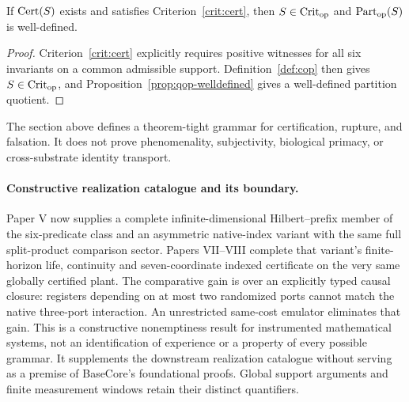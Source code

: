 \begin{theorem}
If $\mathrm{Cert}(S)$ exists and satisfies Criterion~\ref{crit:cert}, then $S\in\mathrm{Crit}_{\mathrm{op}}$ and $\mathrm{Part}_{\mathrm{op}}(S)$ is well-defined.
\end{theorem}

\begin{proof}
Criterion~\ref{crit:cert} explicitly requires positive witnesses for all six invariants on a common admissible support. Definition~\ref{def:cop} then gives $S\in\mathrm{Crit}_{\mathrm{op}}$, and Proposition~\ref{prop:qop-welldefined} gives a well-defined partition quotient.
\end{proof}

\begin{remark}
The section above defines a theorem-tight grammar for certification, rupture, and falsation. It does not prove phenomenality, subjectivity, biological primacy, or cross-substrate identity transport.
\end{remark}

\paragraph{Constructive realization catalogue and its boundary.}
Paper V now supplies a complete infinite-dimensional Hilbert--prefix member
of the six-predicate class and an asymmetric native-index variant with the
same full split-product comparison sector. Papers VII--VIII complete that
variant's finite-horizon life, continuity and seven-coordinate indexed
certificate on the very same globally certified plant. The comparative
gain is over an explicitly typed causal closure: registers depending on at
most two randomized ports cannot match the native three-port interaction.
An unrestricted same-cost emulator eliminates that gain. This is a
constructive nonemptiness result for instrumented mathematical systems, not
an identification of experience or a property of every possible grammar.
It supplements the downstream realization catalogue without serving as a
premise of BaseCore's foundational proofs. Global support arguments and
finite measurement windows retain their distinct quantifiers.
